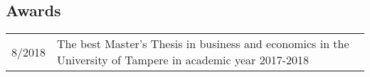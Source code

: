 \documentclass[16pt]{article}
\begin{document}
\subsection*{Awards} 
\begin{tabular}{@{}p{1.5in}p{5in}}
8/2018           & The best Master's Thesis in business and economics in the University of Tampere in academic year 2017-2018 \\
\end{tabular}

%
%
%
\end{document}
